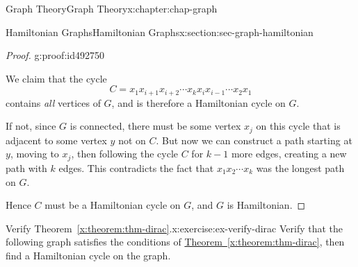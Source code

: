 \documentclass[oneside,10pt,]{book}
\newcommand{\xreffont}{\relax}
\numberwithin{equation}{section}
\begin{document}
\begin{chapterptx}{Graph Theory}{}{Graph Theory}{}{}{x:chapter:chap-graph}
\begin{sectionptx}{Hamiltonian Graphs}{}{Hamiltonian Graphs}{}{}{x:section:sec-graph-hamiltonian}
\begin{proof}{}{g:proof:id492750}
\begin{sidebyside}{1}{0.2}{0.2}{0}
\begin{sbspanel}{0.6}
{
}%
\end{sbspanel}%
\end{sidebyside}%
\par
We claim that the cycle%
\begin{equation*}
C = x_1x_{i+1}x_{i+2} \cdots x_kx_ix_{i-1}\cdots x_2x_1
\end{equation*}
contains \emph{all} vertices of \(G\), and is therefore a Hamiltonian cycle on \(G\).%
\par
If not, since \(G\) is connected, there must be some vertex \(x_j\) on this cycle that is adjacent to some vertex \(y\) not on \(C\). But now we can construct a path starting at \(y\), moving to \(x_j\), then following the cycle \(C\) for \(k-1\) more edges, creating a new path with \(k\) edges. This contradicts the fact that \(x_1x_2\cdots x_k\) was the longest path on \(G\).%
\par
Hence \(C\) must be a Hamiltonian cycle on \(G\), and \(G\) is Hamiltonian.%
\end{proof}
\begin{inlineexercise}{Verify Theorem~{\xreffont\ref*{x:theorem:thm-dirac}}.}{x:exercise:ex-verify-dirac}%
Verify that the following graph satisfies the conditions of \hyperref[x:theorem:thm-dirac]{Theorem~{\xreffont\ref{x:theorem:thm-dirac}}}, then find a Hamiltonian cycle on the graph.%
\begin{sidebyside}{1}{0.325}{0.325}{0}%
\begin{sbspanel}{0.35}%
\end{sbspanel}
\end{sidebyside}
\end{inlineexercise}
\end{sectionptx}
\end{chapterptx}
\end{document}
